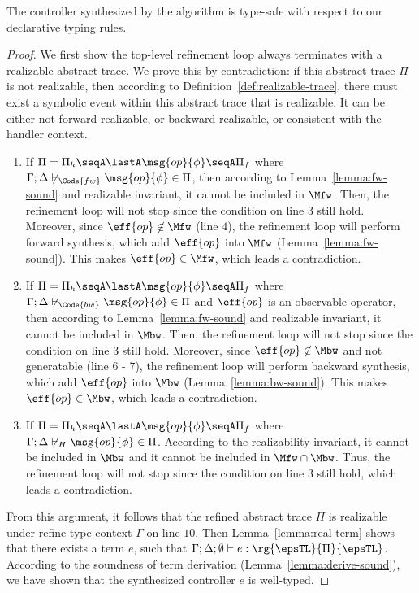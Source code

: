 \begin{theorem}
  \label{theorem:algo-sound-ap}
  The controller synthesized by the algorithm is type-safe with
  respect to our declarative typing rules.%
\end{theorem} %
\begin{proof} %
  We first show the top-level refinement loop always terminates with a
  realizable abstract trace. We prove this by
  contradiction: if this abstract trace $\Pi$ is not realizable, then
  according to Definition~\ref{def:realizable-trace}, there must
  exist a symbolic event within this abstract trace that is
  realizable. It can be either not forward realizable, or backward
  realizable, or consistent with the handler context.
  \begin{enumerate}
  \item If $\Pi = \Pi_h \seqA \lastA \msg{op}{\phi} \seqA \Pi_f$ where
    $\Gamma;\Delta \not\vdash_\Code{fw} \msg{op}{\phi} \in \Pi$, then
    according to Lemma~\ref{lemma:fw-sound} and realizable invariant,
    it cannot be included in $\Mfw$. Then, the refinement loop will
    not stop since the condition on line $3$ still hold. Moreover,
    since $\eff{op} \not\in \Mfw$ (line $4$), the refinement loop will
    perform forward synthesis, which add $\eff{op}$ into $\Mfw$
    (Lemma~\ref{lemma:fw-sound}). This makes $\eff{op} \in \Mfw$,
    which leads a contradiction.
    \item If $\Pi = \Pi_h \seqA \lastA \msg{op}{\phi} \seqA \Pi_f$
      where
      $\Gamma;\Delta \not\vdash_\Code{bw} \msg{op}{\phi} \in \Pi$ and
      $\eff{op}$ is an observable operator, then according to
      Lemma~\ref{lemma:fw-sound} and realizable invariant, it cannot
      be included in $\Mbw$. Then, the refinement loop will not stop
      since the condition on line $3$ still hold. Moreover, since
      $\eff{op} \not\in \Mbw$ and not generatable (line $6$ - $7$),
      the refinement loop will perform backward synthesis, which add
      $\eff{op}$ into $\Mbw$ (Lemma~\ref{lemma:bw-sound}). This makes
      $\eff{op} \in \Mbw$, which leads a contradiction.
    \item If $\Pi = \Pi_h \seqA \lastA \msg{op}{\phi} \seqA \Pi_f$
      where $\Gamma;\Delta \not\vdash_H \msg{op}{\phi} \in \Pi$.
      According to the realizability invariant, it cannot be included
      in $\Mbw$ and it cannot be included in $\Mfw \cap \Mbw$. Thus,
      the refinement loop will not stop since the condition on line
      $3$ still hold, which leads a contradiction. %
    \end{enumerate} %
    From this argument, it follows that the refined abstract trace $\Pi$ is
    realizable under refine type context $\Gamma$ on line $10$. Then
    Lemma~\ref{lemma:real-term} shows that there exists a term $e$,
    such that
    $\Gamma;\Delta;\emptyset \vdash e : \rg{\epsTL}{\Pi}{\epsTL}$.
    According to the soundness of term derivation
    (Lemma~\ref{lemma:derive-sound}), we have shown that the
    synthesized controller $e$ is well-typed.
  \end{proof}
